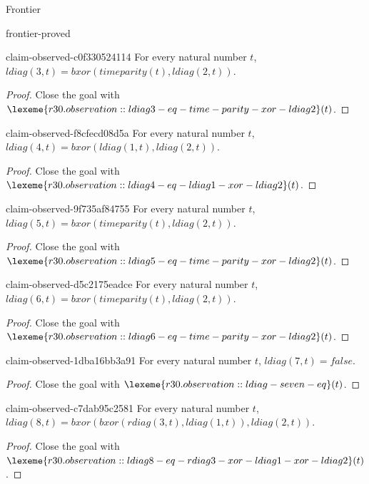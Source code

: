 \begin{lexlean}{Frontier}
\begin{section}{frontier-proved}
\begin{theorem}{claim-observed-c0f330524114}
For every natural number \(t\), \(ldiag(3, t) = bxor(timeparity(t), ldiag(2, t))\).
\begin{proof}
Close the goal with \(\lexeme{r30.observation::ldiag3-eq-time-parity-xor-ldiag2}(t)\).
\end{proof}
\end{theorem}

\begin{theorem}{claim-observed-f8cfecd08d5a}
For every natural number \(t\), \(ldiag(4, t) = bxor(ldiag(1, t), ldiag(2, t))\).
\begin{proof}
Close the goal with \(\lexeme{r30.observation::ldiag4-eq-ldiag1-xor-ldiag2}(t)\).
\end{proof}
\end{theorem}

\begin{theorem}{claim-observed-9f735af84755}
For every natural number \(t\), \(ldiag(5, t) = bxor(timeparity(t), ldiag(2, t))\).
\begin{proof}
Close the goal with \(\lexeme{r30.observation::ldiag5-eq-time-parity-xor-ldiag2}(t)\).
\end{proof}
\end{theorem}

\begin{theorem}{claim-observed-d5c2175eadce}
For every natural number \(t\), \(ldiag(6, t) = bxor(timeparity(t), ldiag(2, t))\).
\begin{proof}
Close the goal with \(\lexeme{r30.observation::ldiag6-eq-time-parity-xor-ldiag2}(t)\).
\end{proof}
\end{theorem}

\begin{theorem}{claim-observed-1dba16bb3a91}
For every natural number \(t\), \(ldiag(7, t) = false\).
\begin{proof}
Close the goal with \(\lexeme{r30.observation::ldiag-seven-eq}(t)\).
\end{proof}
\end{theorem}

\begin{theorem}{claim-observed-c7dab95c2581}
For every natural number \(t\), \(ldiag(8, t) = bxor(bxor(rdiag(3, t), ldiag(1, t)), ldiag(2, t))\).
\begin{proof}
Close the goal with \(\lexeme{r30.observation::ldiag8-eq-rdiag3-xor-ldiag1-xor-ldiag2}(t)\).
\end{proof}
\end{theorem}


\end{section}
\end{lexlean}
